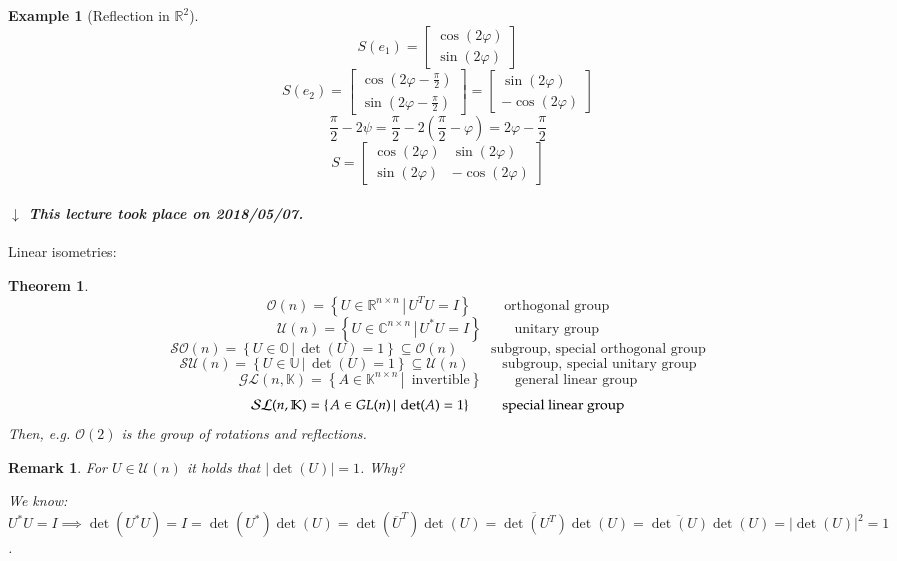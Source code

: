 \documentclass{article}
\newcounter{lecref}[section]
\numberwithin{lecref}{section}
\newtheorem{theorem}[lecref]{Theorem}
\newtheorem{example}[lecref]{Example}
\newtheorem{remark}[lecref]{Remark}
\newcommand{\setdef}[2]{\left\{\left.#1\,\right|\,#2\right\}}
\newcommand{\card}[1]{\left|#1\right|}
\newcommand{\dateref}[1]{%
  \begin{mdframed}[backgroundcolor=gray!10,innerbottommargin=0pt,innertopmargin=0pt]
    \paragraph{\textit{$\downarrow$ This lecture took place on #1.}}%
  \end{mdframed}%
}
\begin{document}
\begin{example}[Reflection in $\mathbb R^2$]
  \[ S(e_1) = \begin{bmatrix} \cos(2\varphi) \\ \sin(2\varphi) \end{bmatrix} \]
  \[ S(e_2) = \begin{bmatrix} \cos(2\varphi - \frac\pi2) \\ \sin(2\varphi - \frac\pi2) \end{bmatrix} = \begin{bmatrix} \sin(2\varphi) \\ -\cos(2\varphi) \end{bmatrix} \]
  \[ \frac\pi2 - 2\psi = \frac\pi2 - 2(\frac\pi2 - \varphi) = 2\varphi - \frac\pi2 \]
  \[ S = \begin{bmatrix} \cos(2\varphi) & \sin(2\varphi) \\ \sin(2\varphi) & -\cos(2\varphi) \end{bmatrix} \]
\end{example}


\dateref{2018/05/07}

Linear isometries:

\begin{theorem} %
  \[ \mathcal O(n) = \setdef{U \in \mathbb R^{n\times n}}{U^TU = I} \qquad \text{ orthogonal group} \]
  \[ \mathcal U(n) = \setdef{U \in \mathbb C^{n\times n}}{U^*U = I} \qquad \text{ unitary group} \]
  \[ \mathcal{SO}(n) = \setdef{U \in \mathbb O}{\det(U) = 1} \subseteq \mathcal O(n) \qquad \text{ subgroup, special orthogonal group} \]
  \[ \mathcal{SU}(n) = \setdef{U \in \mathbb U}{\det(U) = 1} \subseteq \mathcal U(n) \qquad \text{ subgroup, special unitary group} \]
  \[ \mathcal{GL}(n, \mathbb K) = \setdef{A \in \mathbb K^{n\times n}}{\text{ invertible}} \qquad \text{ general linear group} \]
  \[ \mathcal{SL}(n, \mathbb K) = \setdef{A \in \mathbb \mathcal{GL}(n)}{\det(A) = 1} \qquad \text{ special linear group} \]
  Then, e.g. $\mathcal O(2)$ is the group of rotations and reflections.
\end{theorem}

\begin{remark}
  For $U \in \mathcal U(n)$ it holds that $\card{\det(U)} = 1$. Why?

  We know: $U^* U = I \implies \det(U^* U) = I = \det(U^*) \det(U) = \det(\overline{U}^T) \det(U) = \overline{\det(U^T)} \det(U) = \overline{\det(U)} \det(U) = \card{\det(U)}^2 = 1$.
\end{remark}
\end{document}
